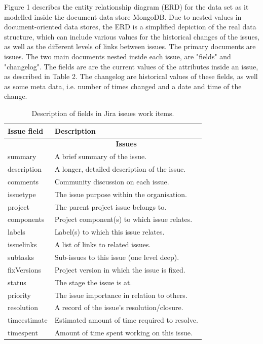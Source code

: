 \documentclass[sigconf]{acmart}
\begin{document}
Figure 1 describes the entity relationship diagram (ERD) for the data set as it modelled inside the document data store MongoDB.
Due to nested values in document-oriented data stores, the ERD is a simplified depiction of the real data structure, which can include various values for the historical changes of the issues, as well as the different levels of links between issues. 
The primary documents are issues.
The two main documents nested inside each issue, are "fields" and "changelog".
The fields are are the current values of the attributes inside an issue, as described in Table 2.
The changelog are historical values of these fields, as well as some meta data, i.e. number of times changed and a date and time of the change.

\begin{table}[h!]
\caption{Description of fields in Jira issues work items.}
\centering
 \begin{tabular}{l l} 
 \hline
 \textbf{Issue field} & \textbf{Description} \\ [0.5ex] 
 \hline\hline
  & \multicolumn{1}{c}{\textbf{Issues}} \\
 summary & A brief summary of the issue. \\ 
 description & A longer, detailed description of the issue. \\
 comments & Community discussion on each issue. \\
 issuetype & The issue purpose within the organisation. \\
 project & The parent project issue belongs to. \\
 components & Project component(s) to which issue relates. \\
 labels & Label(s) to which this issue relates. \\
 issuelinks & A list of links to related issues. \\
 subtasks & Sub-issues to this issue (one level deep). \\
 fixVersions & Project version in which the issue is fixed. \\
 status & The stage the issue is at. \\
 priority & The issue importance in relation to others. \\
 resolution & A record of the issue’s resolution/closure.  \\
 timeestimate & Estimated amount of time required to resolve. \\
 timespent & Amount of time spent working on this issue. \\

\end{tabular}
\end{table}
\end{document}
